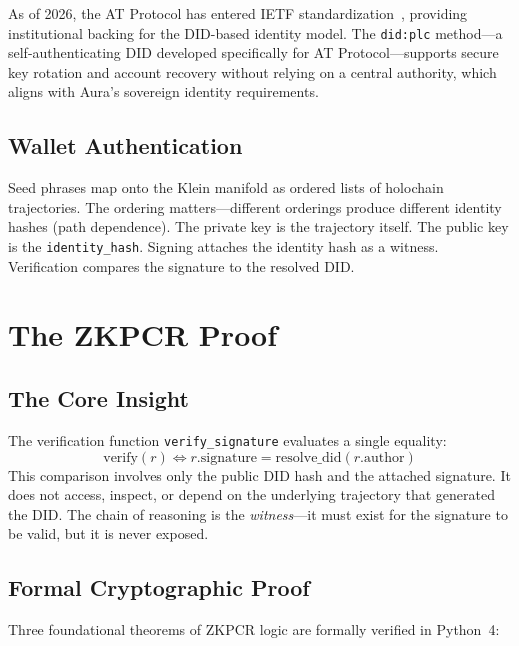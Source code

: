 \documentclass[12pt,a4paper]{article}
\begin{document}
As of 2026, the AT Protocol has entered IETF standardization~\cite{atproto2026ietf}, providing institutional backing for the DID-based identity model. The \texttt{did:plc} method---a self-authenticating DID developed specifically for AT Protocol---supports secure key rotation and account recovery without relying on a central authority, which aligns with Aura's sovereign identity requirements.

\subsection{Wallet Authentication}

Seed phrases map onto the Klein manifold as ordered lists of holochain trajectories. The ordering matters---different orderings produce different identity hashes (path dependence). The private key is the trajectory itself. The public key is the \texttt{identity\_hash}. Signing attaches the identity hash as a witness. Verification compares the signature to the resolved DID.

\section{The ZKPCR Proof}
\label{sec:zkpcr}

\subsection{The Core Insight}

The verification function \texttt{verify\_signature} evaluates a single equality:
\begin{equation}
\mathrm{verify}(r) \iff r.\mathrm{signature} = \mathrm{resolve\_did}(r.\mathrm{author})
\end{equation}
This comparison involves only the public DID hash and the attached signature. It does not access, inspect, or depend on the underlying trajectory that generated the DID. The chain of reasoning is the \emph{witness}---it must exist for the signature to be valid, but it is never exposed.

\subsection{Formal Cryptographic Proof}

Three foundational theorems of ZKPCR logic are formally verified in Python~4:
\end{document}
